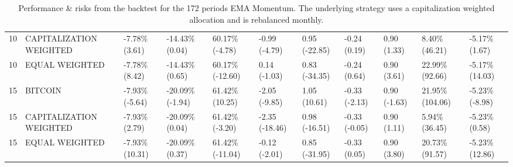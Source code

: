 \documentclass{article}
\begin{document}
\begin{landscape}
\begin{table}[H]
\begin{tabular}{p{0.4cm}|p{3cm}|p{1.65cm}|p{1.65cm}|p{1.65cm}|p{1.65cm}|p{1.65cm}|p{1.65cm}|p{1.65cm}|p{1.65cm}|p{1.65cm}}
10&CAPITALIZATION WEIGHTED&-7.78\% (3.61)&-14.43\% (0.04)&60.17\% (-4.78)&-0.99 (-4.79)&0.95 (-22.85)&-0.24 (0.19)&0.90 (1.33)&8.40\% (46.21)&-5.17\% (1.67)
\\ 
10&EQUAL WEIGHTED&-7.78\% (8.42)&-14.43\% (0.65)&60.17\% (-12.60)&0.14 (-1.03)&0.83 (-34.35)&-0.24 (0.64)&0.90 (3.61)&22.99\% (92.66)&-5.17\% (14.03)
\\ 
15&BITCOIN&-7.93\% (-5.64)&-20.09\% (-1.94)&61.42\% (10.25)&-2.05 (-9.85)&1.05 (10.61)&-0.33 (-2.13)&0.90 (-1.63)&21.95\% (104.06)&-5.23\% (-8.98)
\\ 
15&CAPITALIZATION WEIGHTED&-7.93\% (2.79)&-20.09\% (0.04)&61.42\% (-3.20)&-2.35 (-18.46)&0.98 (-16.51)&-0.33 (-0.05)&0.90 (1.11)&5.94\% (36.45)&-5.23\% (0.58)
\\ 
15&EQUAL WEIGHTED&-7.93\% (10.31)&-20.09\% (0.37)&61.42\% (-11.04)&-0.12 (-2.01)&0.85 (-31.95)&-0.33 (0.05)&0.90 (3.80)&20.73\% (91.57)&-5.23\% (12.86)
\\ 

    \bottomrule
  \end{tabular}
  \label{tab:emamom172capiweight}
   \caption{Performance \& risks from the backtest for the 172 periods EMA Momentum. The underlying strategy uses a capitalization weighted allocation and is rebalanced monthly.}
\end{table}
\end{landscape}
\end{document}
